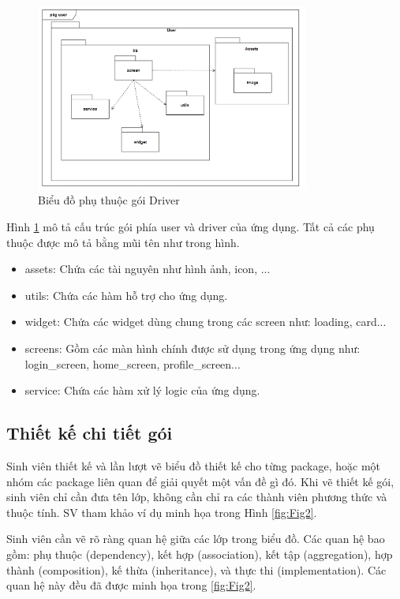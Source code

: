 \documentclass[../DoAn.tex]{subfiles}
\begin{document}
\begin{figure}[H]
    \centering
    \includegraphics[width=0.8\textwidth]{Hinhve/Bieu_do_phu_thuoc_goi_user.png}
    \caption{Biểu đồ phụ thuộc gói Driver}
    \label{fig:Bieu_do_phu_thuoc_goi_user}
\end{figure}

Hình \ref{fig:Bieu_do_phu_thuoc_goi_user} mô tả cấu trúc gói phía user và driver của ứng dụng.
Tất cả các phụ thuộc được mô tả bằng mũi tên như trong hình.
\begin{itemize}
    \item assets: Chứa các tài nguyên như hình ảnh, icon, ...
    \item utils: Chứa các hàm hỗ trợ cho ứng dụng.
    \item widget: Chứa các widget dùng chung trong các screen như: loading, card...
    \item screens: Gồm các màn hình chính được sử dụng trong ứng dụng như: login\_screen, home\_screen, profile\_screen...
    \item service: Chứa các hàm xử lý logic của ứng dụng.
\end{itemize}

\subsection{Thiết kế chi tiết gói}
Sinh viên thiết kế và lần lượt vẽ biểu đồ thiết kế cho từng package, 
hoặc một nhóm các package liên quan để giải quyết một vấn đề gì đó. 
Khi vẽ thiết kế gói, sinh viên chỉ cần đưa tên lớp, không cần chỉ ra 
các thành viên phương thức và thuộc tính. SV tham khảo ví dụ minh họa 
trong Hình \ref{fig:Fig2}.

Sinh viên cần vẽ rõ ràng quan hệ giữa các lớp trong biểu đồ. Các quan 
hệ bao gồm: phụ thuộc (dependency), kết hợp (association), kết tập (aggregation), 
hợp thành (composition), kế thừa (inheritance), và thực thi (implementation). 
Các quan hệ này đều đã được minh họa trong \ref{fig:Fig2}.
\end{document}
